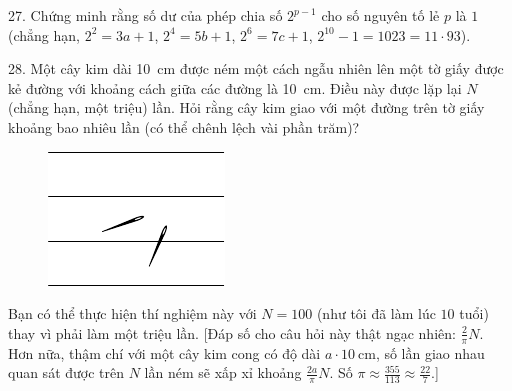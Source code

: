 \begin{problem}{27.}
	Chứng minh rằng số dư của phép chia số $2^{p-1}$ cho số nguyên tố lẻ $p$ là $1$ (chẳng hạn, $2^2 = 3a + 1$, $2^4 = 5b+1$, $2^6 = 7c+1$, $2^{10} - 1 = 1023 = 11\cdot 93$).
\end{problem}

\begin{problem}{28.}
	Một cây kim dài \SI{10}{\cm} được ném một cách ngẫu nhiên lên một tờ giấy được kẻ đường với khoảng cách giữa các đường là \SI{10}{\cm}. Điều này được lặp lại $N$ (chẳng hạn, một triệu) lần. Hỏi rằng cây kim giao với một đường trên tờ giấy khoảng bao nhiêu lần (có thể chênh lệch vài phần trăm)?
	\begin{figure}
		\includegraphics{resources/taskbook-12}
	\end{figure}
	Bạn có thể thực hiện thí nghiệm này với $N=100$ (như tôi đã làm lúc $10$ tuổi) thay vì phải làm một triệu lần. [Đáp số cho câu hỏi này thật ngạc nhiên: $\frac2{\pi}N$. Hơn nữa, thậm chí với một cây kim cong có độ dài $a\cdot \SI{10}{\cm}$, số lần giao nhau quan sát được trên $N$ lần ném sẽ xấp xỉ khoảng $\frac{2a}{\pi}N$. Số $\pi\approx \frac{355}{113}\approx \frac{22}7$.]
\end{problem}

